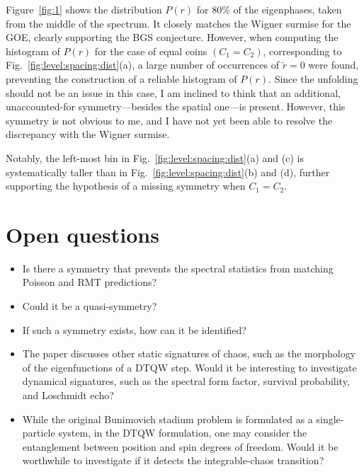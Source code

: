 \documentclass[10pt,letterpaper]{article} %
\begin{document}
Figure~\ref{fig:1} shows the distribution $P(r)$ for $80\%$ of the eigenphases, 
taken from the middle of the spectrum. It closely matches the Wigner surmise for 
the GOE, clearly supporting the BGS conjecture. However, when computing the 
histogram of $P(r)$ for the case of equal coins $(C_1 = C_2)$, corresponding to 
Fig.~\ref{fig:level:spacing:dist}(a), a large number of occurrences of $\tilde{r} = 0$ 
were found, preventing the construction of a reliable histogram of $P(r)$. Since 
the unfolding should not be an issue in this case, I am inclined to think that an 
additional, unaccounted-for symmetry—besides the spatial one—is present. However, 
this symmetry is not obvious to me, and I have not yet been able to resolve the 
discrepancy with the Wigner surmise.

Notably, the left-most bin in Fig.~\ref{fig:level:spacing:dist}(a) and (c) is 
systematically taller than in Fig.~\ref{fig:level:spacing:dist}(b) and (d), further 
supporting the hypothesis of a missing symmetry when $C_1 = C_2$.  

\pagebreak
\section{Open questions}
\begin{itemize}
\item Is there a symmetry that prevents the spectral statistics from matching 
Poisson and RMT predictions?
\item Could it be a quasi-symmetry?  
\item If such a symmetry exists, how can it be identified?
\item The paper discusses other static signatures of chaos, such as the morphology 
of the eigenfunctions of a DTQW step. Would it be interesting to investigate 
dynamical signatures, such as the spectral form factor, survival probability, 
and Loschmidt echo?
\item While the original Bunimovich stadium problem is formulated as a 
single-particle system, in the DTQW formulation, one may consider the 
entanglement between position and spin degrees of freedom. Would it be 
worthwhile to investigate if it detects the integrable-chaos transition?
\end{itemize}



\end{document}
